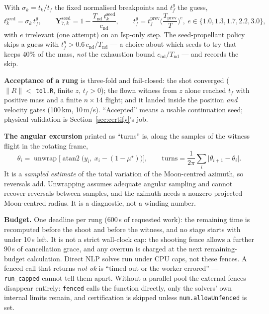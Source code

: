 \documentclass[11pt]{article}
\newcommand{\tf}{t_f}\newcommand{\R}{\mathbb{R}}
\newcommand{\file}[1]{\texttt{#1}}
\newcommand{\Tnd}{T_{\mathrm{nd}}}\newcommand{\cnd}{c_{\mathrm{nd}}}
\begin{document}
\begin{rig}
With $\sigma_k=t_k/\tf$ the fixed normalised breakpoints and $\tf^{g}$ the
guess,
\[
t_k^{\mathrm{seed}}=\sigma_k\,\tf^{g},\qquad
\bm Y^{\mathrm{seed}}_{7,k}=1-\frac{\Tnd\,t_k^{\mathrm{seed}}}{\cnd},\qquad
\tf^{g}=\tf^{\mathrm{prev}}\Big(\frac{T_{\mathrm{prev}}}{T}\Big)^{e},\ e\in\{1.0,1.3,1.7,2.2,3.0\},
\]
with $e$ irrelevant (one attempt) on an Isp-only step. The seed-propellant
policy skips a guess with $\tf^{g}>0.6\,\cnd/\Tnd$ --- a choice about which
seeds to try that keeps 40\% of the mass, \emph{not} the exhaustion bound
$\cnd/\Tnd$ --- and records the skip.

\textbf{Acceptance of a rung} is three-fold and fail-closed: the shot
converged ($\|R\|<$ \file{tol.R}, finite $z$, $\tf>0$); the flown witness
from $z$ alone reached $\tf$ with positive mass and a finite $n\times14$
flight; and it landed inside the position \emph{and} velocity gates
(100\,km, 10\,m/s). ``Accepted'' means a usable continuation seed;
physical validation is Section~\ref{sec:certify}'s job.

\textbf{The angular excursion} printed as ``turns'' is, along the samples
of the witness flight in the rotating frame,
\[
\theta_i=\operatorname{unwrap}\Big[\operatorname{atan2}\big(y_i,\ x_i-(1-\mu^\star)\big)\Big],
\qquad
\mathrm{turns}=\frac{1}{2\pi}\sum_i\big|\theta_{i+1}-\theta_i\big| .
\]
It is a \emph{sampled estimate} of the total variation of the Moon-centred
azimuth, so reversals add. Unwrapping assumes adequate angular sampling and
cannot recover reversals between samples, and the azimuth needs a nonzero
projected Moon-centred radius. It is a diagnostic, not a winding number.

\textbf{Budget.} One deadline per rung (600\,s of requested work): the
remaining time is recomputed before the shoot and before the witness, and no
stage starts with under 10\,s left. It is not a strict wall-clock cap: the
shooting fence allows a further 90\,s of cancellation grace, and any overrun
is charged at the next remaining-budget calculation. Direct NLP solves run
under CPU caps, not these fences. A fenced call that returns \emph{not ok}
is ``timed out or the worker errored'' --- \file{run\_capped} cannot tell them
apart. Without a parallel pool the external fences disappear entirely:
\file{fenced} calls the function directly, only the solvers' own internal
limits remain, and certification is skipped unless \file{num.allowUnfenced}
is set.
\end{rig}
\end{document}
